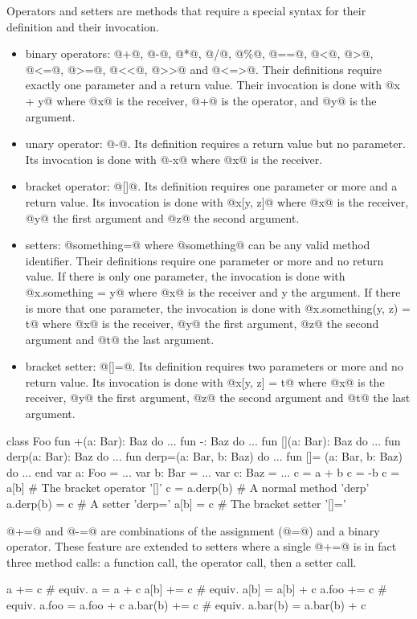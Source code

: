Operators and setters are methods that require a special syntax for their definition and their invocation.

\begin{itemize}
\item binary operators: @+@, @-@, @*@, @/@, @\%@, @==@, @<@, @>@, @<=@, @>=@, @<<@, @>>@ and @<=>@.
Their definitions require exactly one parameter and a return value.
Their invocation is done with @x + y@ where @x@ is the receiver, @+@ is the operator, and @y@ is the argument.
\item unary operator: @-@.
Its definition requires a return value but no parameter.
Its invocation is done with @-x@ where @x@ is the receiver.
\item bracket operator: @[]@.
Its definition requires one parameter or more and a return value.
Its invocation is done with @x[y, z]@ where @x@ is the receiver, @y@ the first argument and @z@ the second argument.
\item setters: @something=@ where @something@ can be any valid method identifier.
Their definitions require one parameter or more and no return value.
If there is only one parameter, the invocation is done with @x.something = y@ where @x@ is the receiver and y the argument.
If there is more that one parameter, the invocation is done with @x.something(y, z) = t@ where @x@ is the receiver, @y@ the first argument, @z@ the second argument and @t@ the last argument.
\item bracket setter: @[]=@.
Its definition requires two parameters or more and no return value.
Its invocation is done with @x[y, z] = t@ where @x@ is the receiver, @y@ the first argument, @z@ the second argument and @t@ the last argument.
\end{itemize}

\begin{lst}
class Foo
	fun +(a: Bar): Baz do ...
	fun -: Baz do ...
	fun [](a: Bar): Baz do ...
	fun derp(a: Bar): Baz do ...
	fun derp=(a: Bar, b: Baz) do ...
	fun []= (a: Bar, b: Baz) do ...
end
var a: Foo = ...
var b: Bar = ...
var c: Baz = ...
c = a + b
c = -b
c = a[b] # The bracket operator '[]'
c = a.derp(b) # A normal method 'derp'
a.derp(b) = c # A setter 'derp='
a[b] = c # The bracket setter '[]='
\end{lst}

@+=@ and @-=@ are combinations of the assignment (@=@) and a binary operator.
These feature are extended to setters where a single @+=@ is in fact three method calls: a function call, the operator call, then a setter call.
\begin{lst}
a += c # equiv. a = a + c
a[b] += c # equiv. a[b] = a[b] + c
a.foo += c # equiv. a.foo = a.foo + c
a.bar(b) += c # equiv. a.bar(b) = a.bar(b) + c
\end{lst} 

